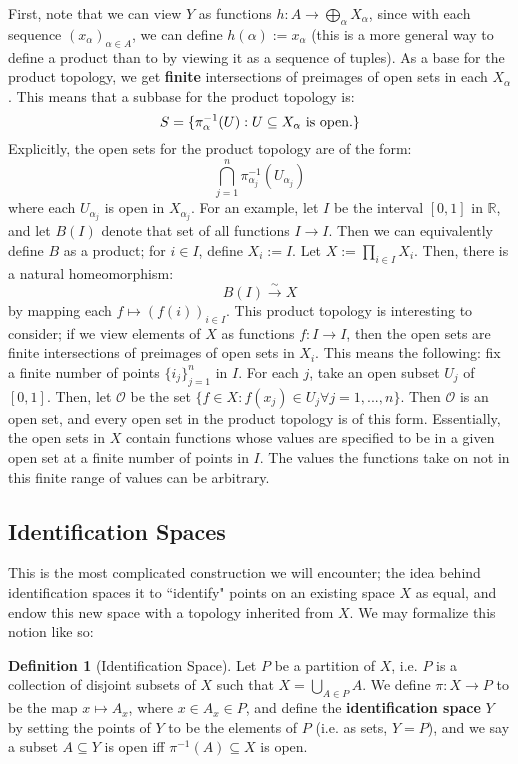 \documentclass[11pt, oneside]{amsart}   	%
\theoremstyle{definition}
\newtheorem{definition}{Definition}[section]
\begin{document}
	First, note that we can view $Y$ as functions $h : A\rightarrow\bigoplus_\alpha X_\alpha$, since with each sequence $(x_\alpha)_{\alpha\in A}$, we can 
	define $h(\alpha) := x_\alpha$ (this is a more general way to define a product than to by viewing it as a sequence of tuples). As a base for the product 
	topology, we get \textbf{finite} intersections of preimages of open sets in each $X_\alpha$. This means that a subbase for the product topology is:
	$$
		S = \{\pi_\alpha^{-1}(U) : U\subseteq X_\alpha\textnormal{ is open.}\}
	$$
	Explicitly, the open sets for the product topology are of the form:
	$$
		\bigcap_{j = 1}^n\pi_{\alpha_j}^{-1}(U_{\alpha_j})
	$$
	where each $U_{\alpha_j}$ is open in $X_{\alpha_j}$. For an example, let $I$ be the interval $[0, 1]$ in $\mathbb R$, and let $B(I)$ denote that 
	set of all functions $I\rightarrow I$. Then we can equivalently define $B$ as a product; for $i\in I$, define $X_i := I$. Let $X := \prod_{i\in I} X_i$. Then, there is a 
	natural homeomorphism:
	$$
		B(I)\xrightarrow{\sim}X
	$$
	by mapping each $f\mapsto (f(i))_{i\in I}$. This product topology is interesting to consider; if we view elements of $X$ as functions $f : I\rightarrow I$, then 
	the open sets are finite intersections of preimages of open sets in $X_i$. This means the following: fix a finite number of points $\{i_j\}_{j = 1}^n$ in $I$. 
	For each $j$, take an open subset $U_j$ of $[0, 1]$. Then, let $\mathcal O$ be the set $\{f\in X : f(x_j) \in U_j\forall j = 1, ..., n\}$. Then $\mathcal O$ is an 
	open set, and every open set in the product topology is of this form. Essentially, the open sets in $X$ contain functions whose values are specified to be in 
	a given open set at a finite number of points in $I$. The values the functions take on not in this finite range of values can be arbitrary.
	
	\subsection{Identification Spaces}
	
	This is the most complicated construction we will encounter; the idea behind identification spaces it to ``identify" points on an existing space $X$ as equal, 
	and endow this new space with a topology inherited from $X$. We may formalize this notion like so:
	
	\begin{definition}[Identification Space]
		Let $P$ be a partition of $X$, i.e. $P$ is a collection of disjoint subsets of $X$ such that $X = \bigcup_{A\in P}A$. We define $\pi : X\rightarrow P$ to be 
		the map $x\mapsto A_x$, where $x\in A_x\in P$, and define the \textbf{identification space} $Y$ by setting the points of $Y$ to be the elements of $P$ 
		(i.e. as sets, $Y = P$), and we say a subset $A\subseteq Y$ is open iff $\pi^{-1}(A)\subseteq X$ is open.
	\end{definition}
	
\end{document}
